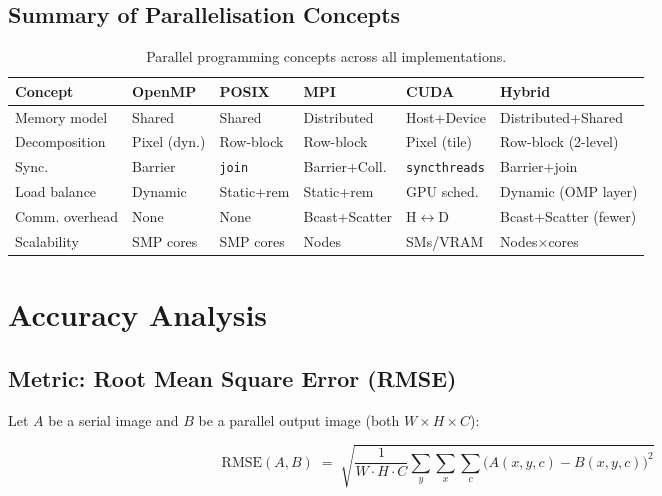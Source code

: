 ﻿\documentclass[12pt,a4paper]{article}
\begin{document}
\subsection{Summary of Parallelisation Concepts}

\begin{table}[H]
\centering
\caption{Parallel programming concepts across all implementations.}
\label{tab:concepts}
\small
\begin{tabular}{llllll}
\toprule
\textbf{Concept} & \textbf{OpenMP} & \textbf{POSIX} & \textbf{MPI} & \textbf{CUDA} & \textbf{Hybrid} \\
\midrule
Memory model  & Shared & Shared & Distributed & Host+Device & Distributed+Shared \\
Decomposition & Pixel (dyn.) & Row-block & Row-block & Pixel (tile) & Row-block (2-level) \\
Sync.         & Barrier & \texttt{join} & Barrier+Coll. & \texttt{syncthreads} & Barrier+join \\
Load balance  & Dynamic & Static+rem & Static+rem & GPU sched. & Dynamic (OMP layer) \\
Comm. overhead& None & None & Bcast+Scatter & H$\leftrightarrow$D & Bcast+Scatter (fewer) \\
Scalability   & SMP cores & SMP cores & Nodes & SMs/VRAM & Nodes$\times$cores \\
\bottomrule
\end{tabular}
\end{table}


\section{Accuracy Analysis}

\subsection{Metric: Root Mean Square Error (RMSE)}

Let $A$ be a serial image and $B$ be a parallel output image (both $W\!\times\!H\!\times\!C$):

\begin{equation}
  \mathrm{RMSE}(A,B) \;=\;
  \sqrt{\frac{1}{W \cdot H \cdot C}
        \sum_{y}\sum_{x}\sum_{c}
        \bigl(A(x,y,c) - B(x,y,c)\bigr)^2}
  \label{eq:rmse}
\end{equation}
\end{document}
